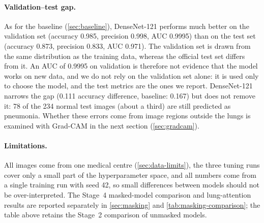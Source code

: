\paragraph{Validation--test gap.}
As for the baseline (\cref{sec:baseline}), DenseNet-121 performs much better on the validation set (accuracy 0.985, precision 0.998, AUC 0.9995) than on the test set (accuracy 0.873, precision 0.833, AUC 0.971).
The validation set is drawn from the same distribution as the training data, whereas the official test set differs from it. An AUC of 0.9995 on validation is therefore not evidence that the model works on new data,
and we do not rely on the validation set alone: it is used only to choose the model, and the test metrics are the ones we report.
DenseNet-121 narrows the gap (0.111 accuracy difference, baseline: 0.167) but does not remove it: 78 of the 234 normal test images (about a third) are still predicted as pneumonia.
Whether these errors come from image regions outside the lungs is examined with Grad-CAM in the next section (\cref{sec:gradcam}).

\paragraph{Limitations.}
All images come from one medical centre (\cref{sec:data-limits}), the three tuning runs cover only a small part of the hyperparameter space,
and all numbers come from a single training run with seed 42, so small differences between models should not be over-interpreted.
The Stage~4 masked-model comparison and lung-attention results are reported separately in \cref{sec:masking} and \cref{tab:masking-comparison};
the table above retains the Stage~2 comparison of unmasked models.

